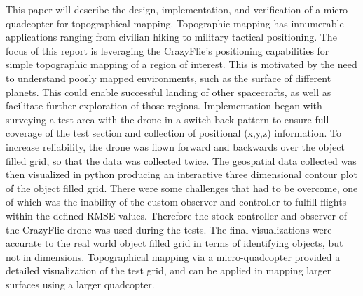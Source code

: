 This paper will describe the design, implementation, and verification of a micro-quadcopter for topographical mapping. Topographic mapping has innumerable applications ranging from civilian hiking to military tactical positioning. The focus of this report is leveraging the CrazyFlie’s positioning capabilities for simple topographic mapping of a region of interest. This is motivated by the need to understand poorly mapped environments, such as the surface of different planets. This could enable successful landing of other spacecrafts, as well as facilitate further exploration of those regions. Implementation began with surveying a test area with the drone in a switch back pattern to ensure full coverage of the test section and collection of positional (x,y,z) information. To increase reliability, the drone was flown forward and backwards over the object filled grid, so that the data was collected twice. The geospatial data collected was then visualized in python producing an interactive three dimensional contour plot of the object filled grid. There were some challenges that had to be overcome, one of which was the inability of the custom observer and controller to fulfill flights within the defined RMSE values. Therefore the stock controller and observer of the CrazyFlie drone was used during the tests. The final visualizations were accurate to the real world object filled grid in terms of identifying objects, but not in dimensions. Topographical mapping via a micro-quadcopter provided a detailed visualization of the test grid, and can be applied in mapping larger surfaces using a larger quadcopter.